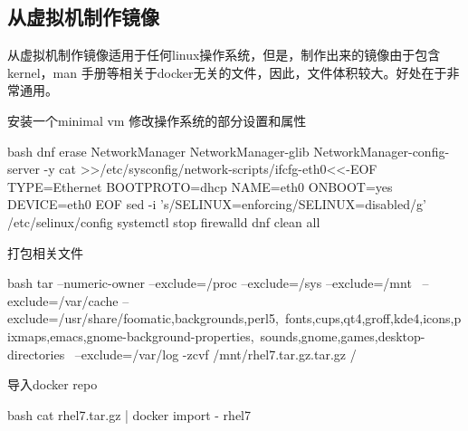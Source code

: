 \subsection{从虚拟机制作镜像}
从虚拟机制作镜像适用于任何linux操作系统，但是，制作出来的镜像由于包含kernel，man
手册等相关于docker无关的文件，因此，文件体积较大。好处在于非常通用。
\begin{outline}[enumerate]
  \1 安装一个minimal vm
  \1 修改操作系统的部分设置和属性
\begin{code-in-enumerate}{bash}
dnf erase NetworkManager NetworkManager-glib NetworkManager-config-server -y
cat >>/etc/sysconfig/network-scripts/ifcfg-eth0<<-EOF
TYPE=Ethernet
BOOTPROTO=dhcp
NAME=eth0
ONBOOT=yes
DEVICE=eth0
EOF
sed -i 's/SELINUX=enforcing/SELINUX=disabled/g' /etc/selinux/config
systemctl stop firewalld
dnf clean all
\end{code-in-enumerate}

  \1 打包相关文件
\begin{code-in-enumerate}{bash}
tar --numeric-owner --exclude=/proc --exclude=/sys --exclude=/mnt \
    --exclude=/var/cache --exclude=/usr/share/{foomatic,backgrounds,perl5,\
    fonts,cups,qt4,groff,kde4,icons,pixmaps,emacs,gnome-background-properties,\
    sounds,gnome,games,desktop-directories}  \
    --exclude=/var/log -zcvf /mnt/rhel7.tar.gz.tar.gz /
\end{code-in-enumerate}

  \1 导入docker repo
\begin{code-in-enumerate}{bash}
cat rhel7.tar.gz | docker import - rhel7
\end{code-in-enumerate}

\end{outline}

